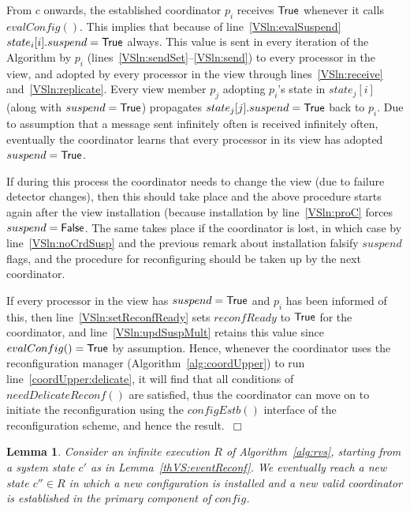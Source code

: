 \documentclass[11pt]{article}
\newtheorem{lemma}[theorem]{Lemma}
\newenvironment{proof}{\noindent{\bf Proof.}}{\hfill$\Box$}
\begin{document}
\begin{proof}
From $c$ onwards, the established coordinator $p_i$ receives $\sf True$ whenever it calls $evalConfig()$.
This implies that because of line~\ref{VSln:evalSuspend} $state_i[i].suspend = {\sf True}$ always.
This value is sent in every iteration of the Algorithm by $p_i$ (lines~\ref{VSln:sendSet}--\ref{VSln:send}) to every processor in the view, and adopted by every processor in the view through lines~\ref{VSln:receive} and~\ref{VSln:replicate}.
Every view member $p_j$ adopting $p_i$'s state in $state_j[i]$ (along with $suspend = \sf True$) propagates $state_j[j].suspend = \sf True$ back to $p_i$.
Due to assumption that a message sent infinitely often is received infinitely often, eventually the coordinator learns that every processor in its view has adopted $suspend = \sf True$.

If during this process the coordinator needs to change the view (due to failure detector changes), then this should take place and the above procedure starts again after the view installation (because installation by line~\ref{VSln:proC} forces $suspend = \sf False$.
The same takes place if the coordinator is lost, in which case by line~\ref{VSln:noCrdSusp} and the previous remark about installation falsify $suspend$ flags, and the procedure for reconfiguring should be taken up by the next coordinator.

If every processor in the view has $suspend = \sf True$ and $p_i$ has been informed of this, then line~\ref{VSln:setReconfReady} sets $reconfReady$ to $\sf True$ for the coordinator, and line~\ref{VSln:updSuspMult} retains this value since $evalConfig() = \sf True$ by assumption.
Hence, whenever the coordinator uses the reconfiguration manager (Algorithm~\ref{alg:coordUpper}) to run line~\ref{coordUpper:delicate}, it will find that all conditions of $needDelicateReconf()$ are satisfied, thus the coordinator can move on to initiate the reconfiguration using the $configEstb()$ interface of the reconfiguration scheme, and hence the result.~\end{proof}

\begin{lemma} 
\label{thVS:stabAfterReconf}
Consider an infinite execution $R$ of Algorithm~\ref{alg:rvs}, starting from a system state $c'$ as in Lemma~\ref{thVS:eventReconf}. 
We eventually reach a new state $c'' \in R$ in which a new configuration is installed and a new valid coordinator is established in the primary component of $config$.
\end{lemma}
\end{document}
